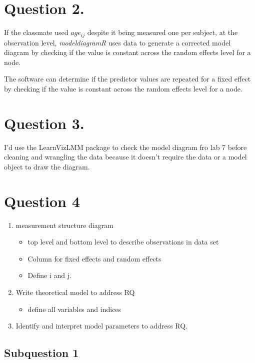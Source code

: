 \documentclass[11pt]{article}
\begin{document}
\section{Question 2.}
\label{sec:orge6663b5}

If the classmate used \(age_{ij}\) despite it being measured one per subject, at the observation level, \emph{modeldiagramR} uses data to generate a corrected model diagram by checking if the value is constant across the random effects level for a node. 

The software can determine if the predictor values are repeated for a fixed effect by checking if the value is constant across the random effects level for a node.


\section{Question 3.}
\label{sec:org93d1179}

I'd use the LearnVizLMM package to check the model diagram fro lab 7 before cleaning and wrangling the data because it doesn't require the data or a model object to draw the diagram.


\section{Question 4}
\label{sec:org6a5c690}

\begin{enumerate}
\item measurement structure diagram
\begin{itemize}
\item top level and bottom level to describe observations in data set
\item Column for fixed effects and random effects
\item Define i and j.
\end{itemize}
\item Write theoretical model to address RQ
\begin{itemize}
\item define all variables and indices
\end{itemize}
\item Identify and interpret model parameters to address RQ.
\end{enumerate}

\subsection{Subquestion 1}
\label{sec:org2911d4b}
\end{document}
